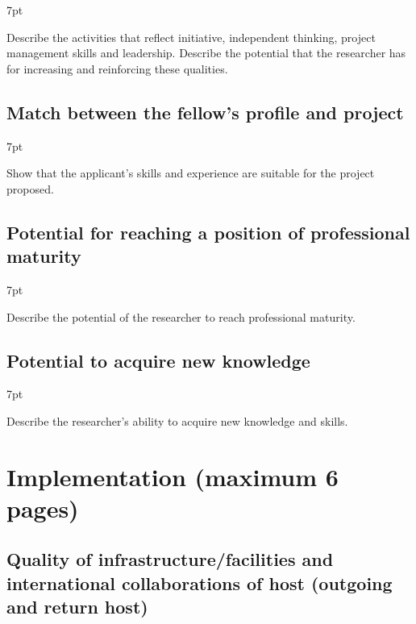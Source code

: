 \documentclass[11pt]{ltxdoc}
\newenvironment{formal}{%
  \def\FrameCommand{%
    \hspace{1pt}%
    {\color{darkblue}\vrule width 2pt}%
    {\color{formalshade}\vrule width 4pt}%
    \colorbox{formalshade}%
  }%
  \MakeFramed{\advance\hsize-\width\FrameRestore}%
  \noindent\hspace{-4.55pt}%
  \begin{adjustwidth}{}{7pt}%
  \vspace{2pt}\vspace{2pt}%
}
{%
  \vspace{2pt}\end{adjustwidth}\endMakeFramed%
}
\begin{document}
\begin{formal}
  Describe the activities that reflect initiative, independent
  thinking, project management skills and leadership. Describe the
  potential that the researcher has for increasing and reinforcing
  these qualities.
\end{formal}

\subsection{Match between the fellow's profile and project}

\begin{formal}
  Show that the applicant's skills and experience are suitable for the
  project proposed.
\end{formal}

\subsection{Potential for reaching a position of professional maturity}

\begin{formal}
  Describe the potential of the researcher to reach professional
  maturity.
\end{formal}

\subsection{Potential to acquire new knowledge}

\begin{formal}
  Describe the researcher's ability to acquire new knowledge and skills.
\end{formal}

\section{Implementation (maximum 6 pages)}

\subsection{Quality of infrastructure/facilities and international
  collaborations of host (outgoing and return host)}
\end{document}
